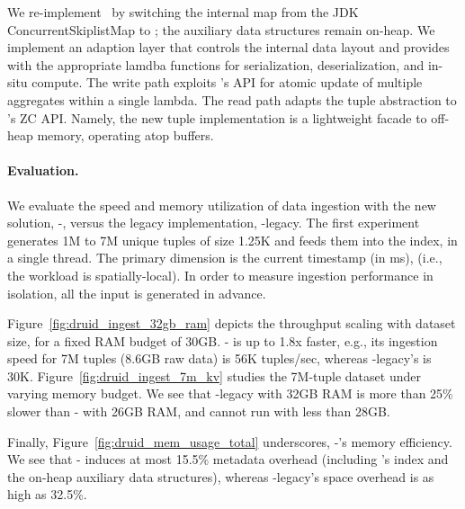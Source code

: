 We re-implement  \II\ by switching the internal map from the JDK ConcurrentSkiplistMap 
to \oak; the auxiliary data structures remain on-heap. 
We implement an adaption layer that controls the internal data layout 
and provides \oak\/ with the appropriate lamdba functions for serialization, deserialization, and in-situ 
compute. The write path exploits \oak's  API for atomic 
update of multiple aggregates within a single lambda. The read path adapts the \II\/ tuple abstraction
to \oak's ZC API. Namely, the new tuple implementation is a lightweight facade to off-heap memory, 
operating atop \oak\/ buffers.

\paragraph{Evaluation.} 
We evaluate the speed and memory utilization of data ingestion with the new solution, \II-\oak,
versus the legacy implementation, \II-legacy. 
The first experiment generates 1M to 7M unique tuples of size 1.25K and feeds them into the index, 
in a single thread. The primary dimension is the current timestamp (in ms), (i.e., the  workload is spatially-local). 
In order to measure ingestion performance in isolation, all the input is generated in advance. 

Figure~\ref{fig:druid_ingest_32gb_ram} depicts the throughput scaling with dataset size, for a fixed RAM budget 
of 30GB. \II-\oak\/ is up to 1.8x faster, e.g., its ingestion speed for 7M tuples (8.6GB 
raw data) is 56K tuples/sec, whereas  \II-legacy's is  30K. Figure~\ref{fig:druid_ingest_7m_kv} 
studies the 7M-tuple dataset under varying memory budget. We see that \II-legacy with 32GB RAM is  more than 25\% slower than
\II-\oak\/ with 26GB RAM, and cannot run with less than 28GB.

Finally, Figure~\ref{fig:druid_mem_usage_total} underscores, \II-\oak's 
memory efficiency. We see that \II-\oak\/ induces at most 15.5\% metadata overhead (including \oak's index and the on-heap 
auxiliary data structures), whereas \II-legacy's space overhead is as high as 32.5\%. 





